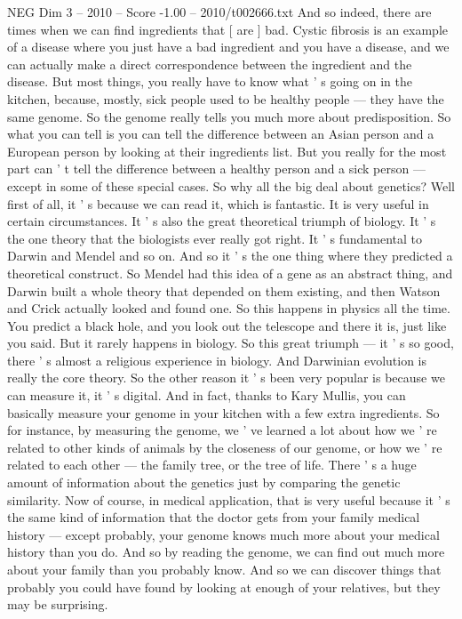 \begin{textsample}{NEG Dim 3 – 2010 – Score -1.00 – 2010/t002666.txt}
And so indeed, there are times when we can find ingredients that [ are ] bad.
Cystic fibrosis is an example of a disease where you just have a bad ingredient and you have a disease, and we can actually make a direct correspondence between the ingredient and the disease.
But most things, you really have to know what ' s going on in the kitchen, because, mostly, sick people used to be healthy people — they have the same genome.
So the genome really tells you much more about predisposition.
So what you can tell is you can tell the difference between an Asian person and a European person by looking at their ingredients list.
But you really for the most part can ' t tell the difference between a healthy person and a sick person — except in some of these special cases.
So why all the big deal about genetics?
Well first of all, it ' s because we can read it, which is fantastic.
It is very useful in certain circumstances.
It ' s also the great theoretical triumph of biology.
It ' s the one theory that the biologists ever really got right.
It ' s fundamental to Darwin and Mendel and so on.
And so it ' s the one thing where they predicted a theoretical construct.
So Mendel had this idea of a gene as an abstract thing, and Darwin built a whole theory that depended on them existing, and then Watson and Crick actually looked and found one.
So this happens in physics all the time.
You predict a black hole, and you look out the telescope and there it is, just like you said.
But it rarely happens in biology.
So this great triumph — it ' s so good, there ' s almost a religious experience in biology.
And Darwinian evolution is really the core theory.
So the other reason it ' s been very popular is because we can measure it, it ' s digital.
And in fact, thanks to Kary Mullis, you can basically measure your genome in your kitchen with a few extra ingredients.
So for instance, by measuring the genome, we ' ve learned a lot about how we ' re related to other kinds of animals by the closeness of our genome, or how we ' re related to each other — the family tree, or the tree of life.
There ' s a huge amount of information about the genetics just by comparing the genetic similarity.
Now of course, in medical application, that is very useful because it ' s the same kind of information that the doctor gets from your family medical history — except probably, your genome knows much more about your medical history than you do.
And so by reading the genome, we can find out much more about your family than you probably know.
And so we can discover things that probably you could have found by looking at enough of your relatives, but they may be surprising.

\end{textsample}
